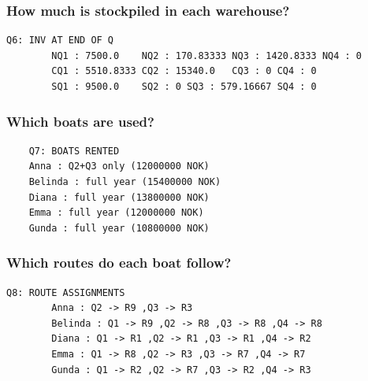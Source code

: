 \documentclass[10pt]{article}
\begin{document}
\subsubsection{How much is stockpiled in each warehouse?}
\begin{verbatim}
Q6: INV AT END OF Q
        NQ1 : 7500.0    NQ2 : 170.83333 NQ3 : 1420.8333 NQ4 : 0
        CQ1 : 5510.8333 CQ2 : 15340.0   CQ3 : 0 CQ4 : 0
        SQ1 : 9500.0    SQ2 : 0 SQ3 : 579.16667 SQ4 : 0
\end{verbatim}
\subsubsection{Which boats are used?}
\begin{verbatim}
    Q7: BOATS RENTED
    Anna : Q2+Q3 only (12000000 NOK)
    Belinda : full year (15400000 NOK)
    Diana : full year (13800000 NOK)
    Emma : full year (12000000 NOK)
    Gunda : full year (10800000 NOK)
\end{verbatim}
\subsubsection{Which routes do each boat follow?}
\begin{verbatim}
Q8: ROUTE ASSIGNMENTS
        Anna : Q2 -> R9 ,Q3 -> R3
        Belinda : Q1 -> R9 ,Q2 -> R8 ,Q3 -> R8 ,Q4 -> R8
        Diana : Q1 -> R1 ,Q2 -> R1 ,Q3 -> R1 ,Q4 -> R2
        Emma : Q1 -> R8 ,Q2 -> R3 ,Q3 -> R7 ,Q4 -> R7
        Gunda : Q1 -> R2 ,Q2 -> R7 ,Q3 -> R2 ,Q4 -> R3
\end{verbatim}
\newpage 
\end{document}

